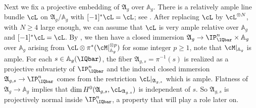 Next we fix a projective embedding of $\mathfrak{A}_g$ over
$\mathbb{A}_g$.
There is a relatively ample line bundle
$\cL$ on $\mathfrak{A}_g/\mathbb{A}_g$ with $[-1]^*\cL = \cL$; see
\cite[Th\'{e}or\`{e}me~XI~1.4]{LNM119}.
After replacing $\cL$
by $\cL^{\otimes N}$, with $N\ge 4$ large enough, we can assume that
$\cL$ is very ample relative over $\mathbb{A}_g$ and $[-1]^*\cL=\cL$.
By \cite[Proposition~4.4.10(ii) and Proposition~4.1.4]{EGAII}, we
then have a closed immersion $\mathfrak{A}_g \rightarrow
\IP^n_{\IQbar} \times \mathbb{A}_g$ over $\mathbb{A}_g$
arising from $\cL \otimes
\pi^*(\cM|_{\mathbb{A}_g}^{\otimes p})$
for some integer $p\ge 1$, note that $\cM|_{\mathbb{A}_g}$ is ample.
For each $s \in \mathbb{A}_g(\IQbar)$, the fiber
$\mathfrak{A}_{g,s}=\pi^{-1}(s)$ is realized as a
projective subvariety of $\IP^n_\IQbar$ and the induced
closed immersion $\mathfrak{A}_{g,s}\rightarrow\IP^n_\IQbar$ comes
from the restriction $\cL|_{\mathfrak{A}_{g,s}}$ which is ample.
Flatness of $\mathfrak{A}_g\rightarrow\mathbb{A}_g$
implies that
$\dim H^0(\mathfrak{A}_{g,s},\cL_{\mathfrak{A}_{g.s}})$ is independent of $s$.
So $\mathfrak{A}_{g,s}$ is projectively
normal inside $\IP^n_\IQbar$, a property that will play a role later on.
